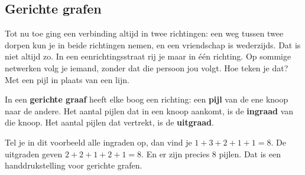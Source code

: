 \subsection{Gerichte grafen}

Tot nu toe ging een verbinding altijd in twee richtingen: een weg tussen twee dorpen kun je in beide richtingen nemen, en een vriendschap is wederzijds. Dat is niet altijd zo. In een eenrichtingsstraat rij je maar in één richting. Op sommige netwerken volg je iemand, zonder dat die persoon jou volgt. Hoe teken je dat? Met een pijl in plaats van een lijn.

\begin{theorie}
In een \textbf{\textcolor{accent}{gerichte graaf}} heeft elke boog een richting: een \textbf{\textcolor{accent}{pijl}} van de ene knoop naar de andere. Het aantal pijlen dat in een knoop aankomt, is de \textbf{\textcolor{accent}{ingraad}} van die knoop. Het aantal pijlen dat vertrekt, is de \textbf{\textcolor{accent}{uitgraad}}.
\end{theorie}


Tel je in dit voorbeeld alle ingraden op, dan vind je $1 + 3 + 2 + 1 + 1 = 8$. De uitgraden geven $2 + 2 + 1 + 2 + 1 = 8$. En er zijn precies 8 pijlen. Dat is een handdrukstelling voor gerichte grafen.

